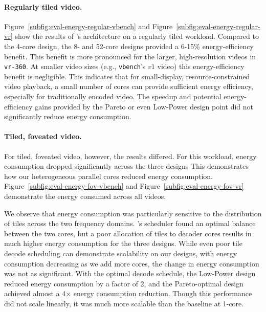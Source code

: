 \evalRegularTileEnergy

\paragraph{Regularly tiled video. } Figure~\ref{subfig:eval-energy-regular-vbench} and Figure~\ref{subfig:eval-energy-regular-vr} show the results of \nameArch's architecture on a regularly tiled workload.
Compared to the 4-core design, the 8- and 52-core designs provided a 6-15\% energy-efficiency benefit.
This benefit is more pronounced for the larger, high-resolution videos in \texttt{vr-360}.
At smaller video sizes (e.g., \texttt{vbench}'s $v1$ video) this energy-efficiency benefit is negligible.
This indicates that for small-display, resource-constrained video playback, a small number of cores can provide sufficient energy efficiency, especially for traditionally encoded video.
The speedup and potential energy-efficiency gains provided by the Pareto or even Low-Power design point did not significantly reduce energy consumption.

\paragraph{Tiled, foveated video.} For tiled, foveated video, however, the results differed.
For this workload, energy consumption dropped significantly across the three designs
This demonstrates how our heterogeneous parallel cores reduced energy consumption.
Figure~\ref{subfig:eval-energy-fov-vbench} and Figure~\ref{subfig:eval-energy-fov-vr} demonstrate the energy consumed across all videos.

We observe that energy consumption was particularly sensitive to the distribution of tiles across the two frequency domains.
\nameArch's scheduler found an optimal balance between the two cores, but a poor allocation of tiles to decoder cores results in much higher energy consumption for the three \nameArch designs.
While even poor tile decode scheduling can demonstrate scalability on our designs, with energy consumption decreasing as we add more cores, the change in energy consumption was not as significant.
With the optimal decode schedule, the Low-Power design reduced energy consumption by a factor of 2, and the Pareto-optimal design achieved almost a 4$\times$ energy consumption reduction.
Though this performance did not scale linearly, it was much more scalable than the baseline at 1-core.

